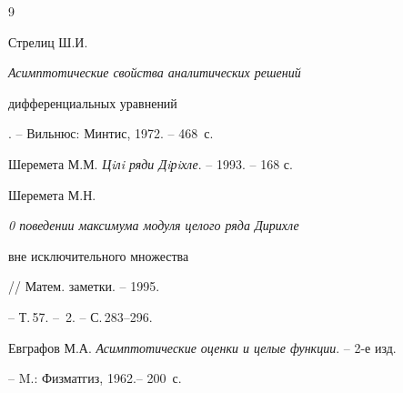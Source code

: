 \begin{thebibliography}{9} 


 




Стрелиц Ш.И. {\em Асимптотические свойства аналитических решений 


дифференциальных уравнений}. -- Вильнюс: Минтис, 1972. -- 468~с. 




Шеремета М.М. {\em Цiлi ряди Дiрiхле}. -- 1993. -- 168 с. 




Шеремета М.Н. {\em 0 поведении максимума модуля целого ряда Дирихле 


вне исключительного множества} // Матем. заметки. -- 1995. 


-- Т.\,57. -- \No\,2. -- С.\,283--296. 




Евграфов М.А. {\em Асимптотические оценки и целые функции}. -- 2-е изд. 


-- M.: Физматгиз, 1962.-- 200~с. 


 


 


\end{thebibliography} 


 


\vskip 2cm 


 






 


 


